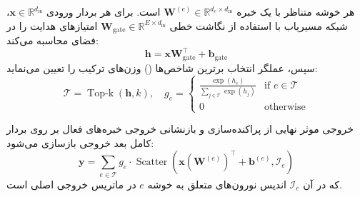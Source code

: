 هر خوشه متناظر با یک خبره $\mathbf{W}^{(e)} \in \mathbb{R}^{d_e \times d_{\text{in}}}$ است. برای هر بردار ورودی $\mathbf{x} \in \mathbb{R}^{d_{\text{in}}}$، شبکه مسیریاب با استفاده از نگاشت خطی $\mathbf{W}_{\text{gate}} \in \mathbb{R}^{E \times d_{\text{in}}}$ امتیازهای هدایت را در فضای  محاسبه می‌کند:
\begin{equation}
\mathbf{h} = \mathbf{x} \mathbf{W}_{\text{gate}}^\top + \mathbf{b}_{\text{gate}}
\end{equation}
سپس، عملگر انتخاب برترین شاخص‌ها () وزن‌های ترکیب را تعیین می‌نماید:
\begin{equation}
\mathcal{T} = \operatorname{Top-k}(\mathbf{h}, k), \quad g_e = \begin{cases} \frac{\exp(h_e)}{\sum_{j \in \mathcal{T}} \exp(h_j)} & \text{if } e \in \mathcal{T} \\ 0 & \text{otherwise} \end{cases}
\end{equation}

خروجی موثر نهایی از پراکنده‌سازی و بازنشانی خروجی خبره‌های فعال بر روی بردار کامل بعد خروجی بازسازی می‌شود:
\begin{equation}
\mathbf{y} = \sum_{e \in \mathcal{T}} g_e \cdot \operatorname{Scatter}\left(\mathbf{x} (\mathbf{W}^{(e)})^\top + \mathbf{b}^{(e)}, \mathcal{I}_e\right)
\end{equation}
که در آن $\mathcal{I}_e$ اندیس نورون‌های متعلق به خوشه $e$ در ماتریس خروجی اصلی است.

